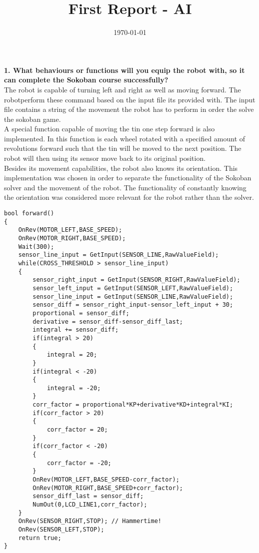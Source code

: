 \documentclass[10pt,a4paper]{article}
\title{First Report - AI}
\date{\today}
\author{}
\begin{document}
\maketitle
\newpage
\textbf{ 1.  What behaviours or functions will you equip the robot with, so it can complete
     the Sokoban course successfully?}\\
     
     The robot is capable of turning left and right as well as moving forward. The robotperform these command based on the input file its provided with. The input file contains a string of the movement the robot has to perform in order the solve the sokoban game. \\
     
	A special function capable of moving the tin one step forward is  also implemented. In this function is each wheel rotated  with a specified amount of revolutions forward such that the tin will be moved to the next position. The robot will then using its sensor  move back to its original position. \\

     
     Besides its movement capabilities,  the robot also knows its orientation. This implementation was chosen in order to separate the functionality of the Sokoban solver and the movement of the robot.  The functionality of constantly knowing the orientation was considered more relevant for the robot rather than the solver. 
     
\begin{lstlisting}
bool forward()
{    
    OnRev(MOTOR_LEFT,BASE_SPEED);
    OnRev(MOTOR_RIGHT,BASE_SPEED); 
    Wait(300); 
    sensor_line_input = GetInput(SENSOR_LINE,RawValueField);
    while(CROSS_THRESHOLD > sensor_line_input)
    {
        sensor_right_input = GetInput(SENSOR_RIGHT,RawValueField);
        sensor_left_input = GetInput(SENSOR_LEFT,RawValueField);
        sensor_line_input = GetInput(SENSOR_LINE,RawValueField);        
        sensor_diff = sensor_right_input-sensor_left_input + 30;
        proportional = sensor_diff;
        derivative = sensor_diff-sensor_diff_last;
        integral += sensor_diff;
        if(integral > 20)
        {
            integral = 20;
        }       
        if(integral < -20)
        {
            integral = -20;
        }
        corr_factor = proportional*KP+derivative*KD+integral*KI;       
        if(corr_factor > 20)
        {
            corr_factor = 20;
        } 
        if(corr_factor < -20)
        {
            corr_factor = -20;
        }        
        OnRev(MOTOR_LEFT,BASE_SPEED-corr_factor);
        OnRev(MOTOR_RIGHT,BASE_SPEED+corr_factor);   
        sensor_diff_last = sensor_diff;
        NumOut(0,LCD_LINE1,corr_factor);
    } 
    OnRev(SENSOR_RIGHT,STOP); // Hammertime!
    OnRev(SENSOR_LEFT,STOP); 
    return true;
}
\end{lstlisting}
     
\end{document}
